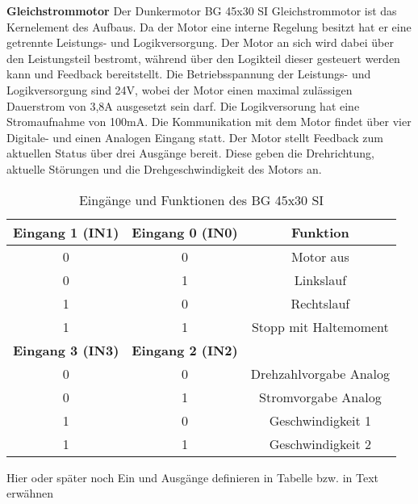 \noindent\textbf{Gleichstrommotor}\newline
Der Dunkermotor BG 45x30 SI Gleichstrommotor ist das Kernelement des Aufbaus. Da der Motor eine interne Regelung besitzt hat er eine getrennte Leistungs- und Logikversorgung. Der Motor an sich wird dabei über den Leistungsteil bestromt, während über den Logikteil dieser gesteuert werden kann und Feedback bereitstellt. Die Betriebsspannung der Leistungs- und Logikversorgung sind 24V, wobei der Motor einen maximal zulässigen Dauerstrom von 3,8A ausgesetzt sein darf. Die Logikversorung hat eine Stromaufnahme von 100mA. Die Kommunikation mit dem Motor findet über vier Digitale- und einen Analogen Eingang statt. Der Motor stellt Feedback zum aktuellen Status über drei Ausgänge bereit. Diese geben die Drehrichtung, aktuelle Störungen und die Drehgeschwindigkeit des Motors an.\\
\begin{table}[H]
	\centering
		\begin{tabular}{|c|c|c|}
			\hline
			\textbf{Eingang 1 (IN1)} & \textbf{Eingang 0 (IN0)} & \textbf{Funktion}      \\ \hline
			0                        & 0                        & Motor aus              \\ \hline
			0                        & 1                        & Linkslauf              \\ \hline
			1                        & 0                        & Rechtslauf             \\ \hline
			1                        & 1                        & Stopp mit Haltemoment  \\ \hline
			\textbf{Eingang 3 (IN3)} & \textbf{Eingang 2 (IN2)} &                        \\ \hline
			0                        & 0                        & Drehzahlvorgabe Analog \\ \hline
			0                        & 1                        & Stromvorgabe Analog    \\ \hline
			1                        & 0                        & Geschwindigkeit 1      \\ \hline
			1                        & 1                        & Geschwindigkeit 2      \\ \hline
		\end{tabular}%
	\caption{Eingänge und Funktionen des BG 45x30 SI}
	\label{tab:digitale_Eingaenge}
\end{table}
Hier oder später noch Ein und Ausgänge definieren in Tabelle bzw. in Text erwähnen
\\

